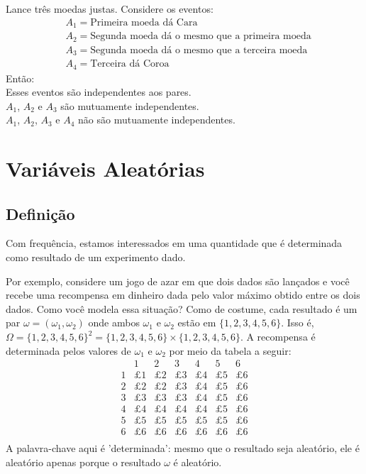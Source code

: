 \begin{example}
Lance três moedas justas.
Considere os eventos:
\begin{align}
&
A_1 = \text{Primeira moeda dá Cara}
\\
&
A_2 = \text{Segunda moeda dá o mesmo que a primeira moeda}
\\
&
A_3 = \text{Segunda moeda dá o mesmo que a terceira moeda}
\\
&
A_4 = \text{Terceira dá Coroa}
\end{align}
Então:
\\
Esses eventos são independentes aos pares.
\\
$ A_1 $, $ A_2 $ e $ A_3 $ são mutuamente independentes.
\\
$ A_1 $, $ A_2 $, $ A_3 $ e $ A_4 $ não são mutuamente independentes.
\end{example}


\clearpage
\section{Variáveis Aleatórias}

\subsection{Definição}

Com frequência, estamos interessados em uma quantidade que é determinada como resultado de um experimento dado.

Por exemplo, considere um jogo de azar em que dois dados são lançados e você recebe uma recompensa em dinheiro dada pelo valor máximo obtido entre os dois dados.
Como você modela essa situação?
Como de costume, cada resultado é um par $ \omega = (\omega_1, \omega_2) $ onde ambos $ \omega_1 $ e $ \omega_2 $ estão em $ \{1,2,3,4,5,6\} $.
Isso é, $ \Omega = \{1,2,3,4,5,6\}^2 = \{1,2,3,4,5,6\} \times \{1,2,3,4,5,6\} $.
A recompensa é determinada pelos valores de $ \omega_1 $ e $ \omega_2 $ por meio da tabela a seguir:
\[
\begin{array}{r|rrrrrr}
  & 1 & 2 & 3 & 4 & 5 & 6 \\
\hline
1 & \pounds1 & \pounds2 & \pounds3 & \pounds4 & \pounds5 & \pounds6 \\
2 & \pounds2 & \pounds2 & \pounds3 & \pounds4 & \pounds5 & \pounds6 \\
3 & \pounds3 & \pounds3 & \pounds3 & \pounds4 & \pounds5 & \pounds6 \\
4 & \pounds4 & \pounds4 & \pounds4 & \pounds4 & \pounds5 & \pounds6 \\
5 & \pounds5 & \pounds5 & \pounds5 & \pounds5 & \pounds5 & \pounds6 \\
6 & \pounds6 & \pounds6 & \pounds6 & \pounds6 & \pounds6 & \pounds6 \\
\end{array}
\]
A palavra-chave aqui é 'determinada': mesmo que o resultado seja aleatório, ele é aleatório apenas porque o resultado $ \omega $ é aleatório.

